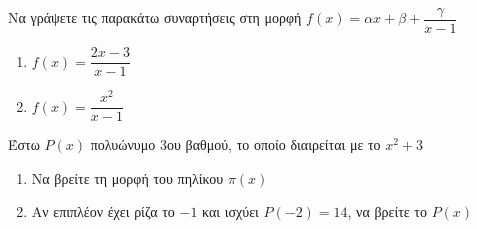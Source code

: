 \documentclass{../presentation}
\begin{document}
\begin{askisi}
  Να γράψετε τις παρακάτω συναρτήσεις στη μορφή $f(x)=αx+β+\dfrac{γ}{x-1}$
  \begin{enumerate}
    \item<1-> $f(x)=\dfrac{2x-3}{x-1}$
    \item<2-> $f(x)=\dfrac{x^2}{x-1}$
  \end{enumerate}

\end{askisi}

\begin{askisi}
  Έστω $P(x)$ πολυώνυμο 3ου βαθμού, το οποίο διαιρείται με το $x^2+3$
  \begin{enumerate}
    \item<1-> Να βρείτε τη μορφή του πηλίκου $π(x)$
    \item<2-> Αν επιπλέον έχει ρίζα το $-1$ και ισχύει $P(-2)=14$, να βρείτε το $P(x)$
  \end{enumerate}


\end{askisi}


%
%
%
%
%
%
%
\end{document}
